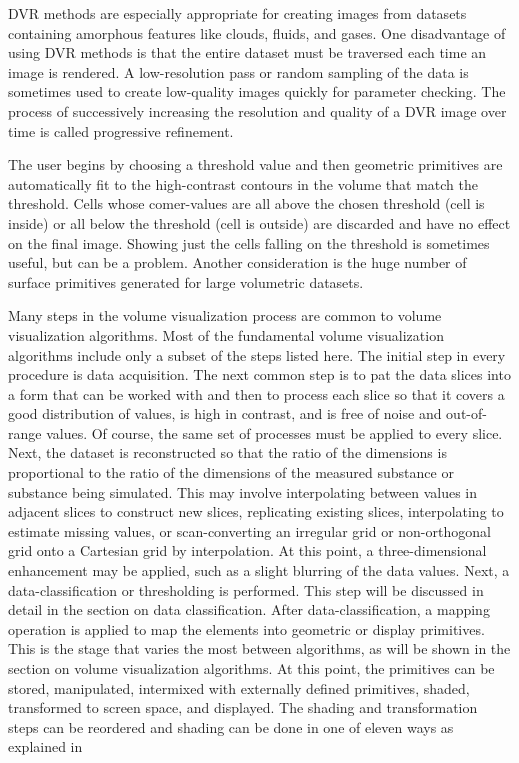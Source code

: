 DVR methods are especially appropriate for creating images from datasets containing amorphous features like clouds, fluids, and gases. One disadvantage of using DVR methods
is that the entire dataset must be traversed each time an image is
rendered. A low-resolution pass or random sampling of the data is
sometimes used to create low-quality images quickly for parameter
checking. The process of successively increasing the resolution
and quality of a DVR image over time is called progressive
refinement.

 The user begins by choosing a threshold value
and then geometric primitives are automatically fit to the high-contrast
contours in the volume that match the threshold. Cells
whose comer-values are all above the chosen threshold (cell is
inside) or all below the threshold (cell is outside) are discarded and
have no effect on the final image. Showing just the cells falling on
the threshold is sometimes useful, but can be a problem. Another
consideration is the huge number of surface primitives generated
for large volumetric datasets. 


Many steps in the volume visualization process are common to
volume visualization algorithms.  Most of the fundamental volume
visualization algorithms include only a subset of the steps listed
here.
The initial step in every procedure is data acquisition. The next common step is to pat the data slices into a form that can be worked with and then to process each slice so that it covers a good distribution of values, is high in contrast, and is free of noise and
out-of-range values. Of course, the same set of processes must be
applied to every slice.
Next, the dataset is reconstructed so that the ratio of the
dimensions is proportional to the ratio of the dimensions of the
measured substance or substance being simulated. This may
involve interpolating between values in adjacent slices to construct
new slices, replicating existing slices, interpolating to estimate
missing values, or scan-converting an irregular grid or non-orthogonal
grid onto a Cartesian grid by interpolation. At this point, a three-dimensional enhancement may be applied, such as a slight
blurring of the data values. Next, a data-classification or
thresholding is performed. This step will be discussed in detail in
the section on data classification.
After data-classification, a mapping operation is applied to map
the elements into geometric or display primitives. This is the stage
that varies the most between algorithms, as will be shown in the
section on volume visualization algorithms. At this point, the
primitives can be stored, manipulated, intermixed with externally
defined primitives, shaded, transformed to screen space, and
displayed. The shading and transformation steps can be reordered
and shading can be done in one of eleven ways as explained in 


